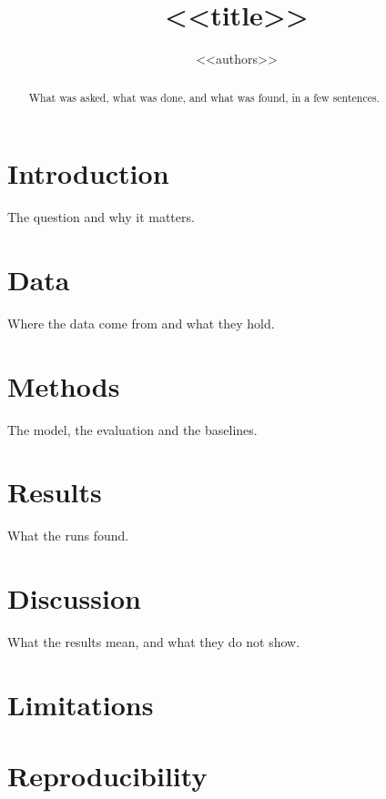 \documentclass[11pt]{article}
\title{<<title>>}
\author{<<authors>>}
\date{}
\begin{document}
\maketitle

\begin{abstract}
What was asked, what was done, and what was found, in a few sentences.
\end{abstract}

\section{Introduction}
The question and why it matters.

\section{Data}
Where the data come from and what they hold. %

\section{Methods}
The model, the evaluation and the baselines. %

\section{Results}
What the runs found. %

\section{Discussion}
What the results mean, and what they do not show.

\section{Limitations}

\section{Reproducibility}
\end{document}
